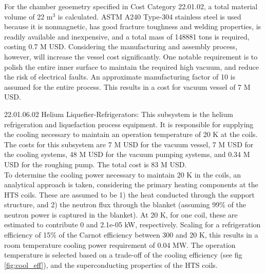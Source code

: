 For the chamber geoemetry specified in Cost Category 22.01.02, a total material volume of 22 m$^3$ is calculated. ASTM A240 Type-304 stainless steel is used because it is nonmagnetic, has good fracture toughness and welding properties, is readily available and inexpensive, and a total mass of 148881 tons is required, costing 0.7 M USD. Considering the manufacturing and assembly process, however, will increase the vessel cost significantly. One notable requirement is to polish the entire inner surface to maintain the required high vacuum, and reduce the risk of electrical faults. An approximate manufacturing factor of 10 is assumed for the entire process. This results in a cost for vacuum vessel of 7 M USD.\\

\begin{table}[h]
    \centering
    \caption{Vacuum vessel parameters.}
    \label{tab:ves_params}
\end{table}



22.01.06.02 Helium Liquefier-Refrigerators: This subsystem is the helium refrigeration and liquefaction process equipment. It is responsible for supplying the cooling necessary to maintain an operation temperature of 20 K at the coils. \\

The costs for this subsystem are 7 M USD for the vacuum vessel, 7 M USD for the cooling systems, 48 M USD for the vacuum pumping systems, and 0.34 M USD for the roughing pump. The total cost is 83 M USD.\\

To determine the cooling power necessary to maintain 20 K in the coils, an analytical approach is taken, considering the primary heating components at the HTS coils. These are assumed to be 1) the heat conducted through the support structure, and 2) the neutron flux through the blanket (assuming 99\% of the neutron power is captured in the blanket). At 20 K, for one coil, these are estimated to contribute 0 and 2.1e-05 kW, respectively. Scaling for a refrigeration efficiency of 15\% of the Carnot efficiency between 300 and 20 K, this results in a room temperature cooling power requirement of 0.04 MW. The operation temperature is selected based on a trade-off of the cooling efficiency (see fig \ref{fig:cool_eff}), and the superconducting properties of the HTS coils.\\

